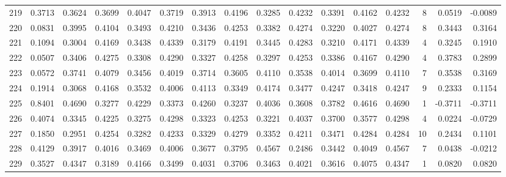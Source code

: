 \begin{tabular}{lrrrrrrrrrrrrrrr}
219 &      0.3713 &  0.3624 &  0.3699 &  0.4047 &  0.3719 &  0.3913 &  0.4196 &  0.3285 &  0.4232 &  0.3391 &   0.4162 &     0.4232 &      8 &                    0.0519 &                    -0.0089 \\
220 &      0.0831 &  0.3995 &  0.4104 &  0.3493 &  0.4210 &  0.3436 &  0.4253 &  0.3382 &  0.4274 &  0.3220 &   0.4027 &     0.4274 &      8 &                    0.3443 &                     0.3164 \\
221 &      0.1094 &  0.3004 &  0.4169 &  0.3438 &  0.4339 &  0.3179 &  0.4191 &  0.3445 &  0.4283 &  0.3210 &   0.4171 &     0.4339 &      4 &                    0.3245 &                     0.1910 \\
222 &      0.0507 &  0.3406 &  0.4275 &  0.3308 &  0.4290 &  0.3327 &  0.4258 &  0.3297 &  0.4253 &  0.3386 &   0.4167 &     0.4290 &      4 &                    0.3783 &                     0.2899 \\
223 &      0.0572 &  0.3741 &  0.4079 &  0.3456 &  0.4019 &  0.3714 &  0.3605 &  0.4110 &  0.3538 &  0.4014 &   0.3699 &     0.4110 &      7 &                    0.3538 &                     0.3169 \\
224 &      0.1914 &  0.3068 &  0.4168 &  0.3532 &  0.4006 &  0.4113 &  0.3349 &  0.4174 &  0.3477 &  0.4247 &   0.3418 &     0.4247 &      9 &                    0.2333 &                     0.1154 \\
225 &      0.8401 &  0.4690 &  0.3277 &  0.4229 &  0.3373 &  0.4260 &  0.3237 &  0.4036 &  0.3608 &  0.3782 &   0.4616 &     0.4690 &      1 &                   -0.3711 &                    -0.3711 \\
226 &      0.4074 &  0.3345 &  0.4225 &  0.3275 &  0.4298 &  0.3323 &  0.4253 &  0.3221 &  0.4037 &  0.3700 &   0.3577 &     0.4298 &      4 &                    0.0224 &                    -0.0729 \\
227 &      0.1850 &  0.2951 &  0.4254 &  0.3282 &  0.4233 &  0.3329 &  0.4279 &  0.3352 &  0.4211 &  0.3471 &   0.4284 &     0.4284 &     10 &                    0.2434 &                     0.1101 \\
228 &      0.4129 &  0.3917 &  0.4016 &  0.3469 &  0.4006 &  0.3677 &  0.3795 &  0.4567 &  0.2486 &  0.3442 &   0.4049 &     0.4567 &      7 &                    0.0438 &                    -0.0212 \\
229 &      0.3527 &  0.4347 &  0.3189 &  0.4166 &  0.3499 &  0.4031 &  0.3706 &  0.3463 &  0.4021 &  0.3616 &   0.4075 &     0.4347 &      1 &                    0.0820 &                     0.0820 \\

\end{tabular}
